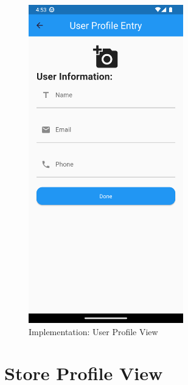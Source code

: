 \documentclass[../thesis.tex]{subfiles}
\begin{document}
\begin{figure}[H]
    \centering
    \includegraphics[width=0.60\textwidth]{images/UserProfile_EntryForm.png}
    \caption{Implementation: User Profile View}
    \label{fig:UserProfile_EntryForm}
\end{figure}

\section{Store Profile View}
\end{document}
